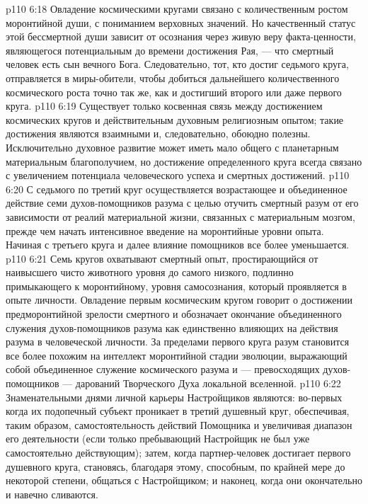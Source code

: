 \vs p110 6:18 Овладение космическими кругами связано с количественным ростом моронтийной души, с пониманием верховных значений. Но качественный статус этой бессмертной души  зависит от осознания через живую веру факта\hyp{}ценности, являющегося потенциальным до времени достижения Рая, --- что смертный человек есть сын вечного Бога. Следовательно, тот, кто достиг седьмого круга, отправляется в миры\hyp{}обители, чтобы добиться дальнейшего количественного космического роста точно так же, как и достигший второго или даже первого круга.
\vs p110 6:19 Существует только косвенная связь между достижением космических кругов и действительным духовным религиозным опытом; такие достижения являются взаимными и, следовательно, обоюдно полезны. Исключительно духовное развитие может иметь мало общего с планетарным материальным благополучием, но достижение определенного круга всегда связано с увеличением потенциала человеческого успеха и смертных достижений.
\vs p110 6:20 С седьмого по третий круг осуществляется возрастающее и объединенное действие семи духов\hyp{}помощников разума с целью отучить смертный разум от его зависимости от реалий материальной жизни, связанных с материальным мозгом, прежде чем начать интенсивное введение на моронтийные уровни опыта. Начиная с третьего круга и далее влияние помощников все более уменьшается.
\vs p110 6:21 \pc Семь кругов охватывают смертный опыт, простирающийся от наивысшего чисто животного уровня до самого низкого, подлинно примыкающего к моронтийному, уровня самосознания, который проявляется в опыте личности. Овладение первым космическим кругом говорит о достижении предморонтийной зрелости смертного и обозначает окончание объединенного служения духов\hyp{}помощников разума как единственно влияющих на действия разума в человеческой личности. За пределами первого круга разум становится все более похожим на интеллект моронтийной стадии эволюции, выражающий собой объединенное служение космического разума и --- превосходящих духов\hyp{}помощников --- дарований Творческого Духа локальной вселенной.
\vs p110 6:22 Знаменательными днями личной карьеры Настройщиков являются: во\hyp{}первых когда их подопечный субъект проникает в третий душевный круг, обеспечивая, таким образом, самостоятельность действий Помощника и увеличивая диапазон его деятельности (если только пребывающий Настройщик не был уже самостоятельно действующим); затем, когда партнер\hyp{}человек достигает первого душевного круга, становясь, благодаря этому, способным, по крайней мере до некоторой степени, общаться с Настройщиком; и наконец, когда они окончательно и навечно сливаются.
